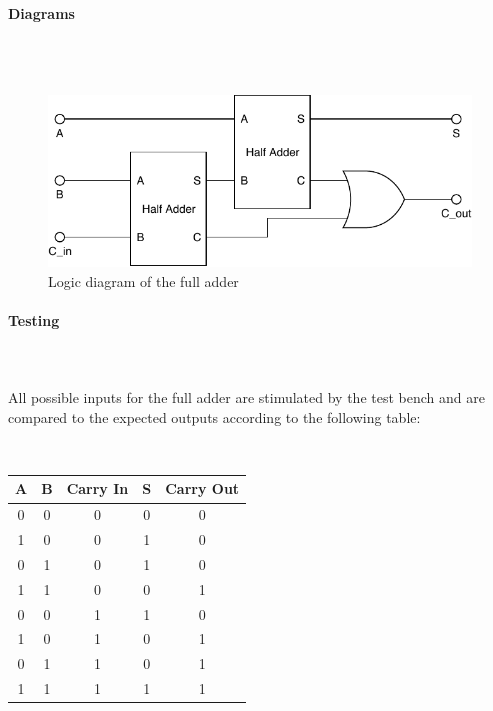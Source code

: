 \documentclass{article}
\begin{document}
    \paragraph{Diagrams}
    \hfill\\\\
    \begin{figure}[H]
        \centering
        \includegraphics{../diagrams/alu/adder/full_adder.pdf}
        \caption{Logic diagram of the full adder}
    \end{figure}

    \paragraph{Testing}
    \hfill\\\\
    All possible inputs for the full adder are stimulated by the test bench
    and are compared to the expected outputs according to the following
    table:

    \hfill\\
    \begin{tabular}{|c|c|c||c|c|}
        \hline
        A & B & Carry In & S & Carry Out
        \\\hline\hline
        0 & 0 & 0 & 0 & 0
        \\\hline
        1 & 0 & 0 & 1 & 0
        \\\hline
        0 & 1 & 0 & 1 & 0
        \\\hline
        1 & 1 & 0 & 0 & 1
        \\\hline
        0 & 0 & 1 & 1 & 0
        \\\hline
        1 & 0 & 1 & 0 & 1
        \\\hline
        0 & 1 & 1 & 0 & 1
        \\\hline
        1 & 1 & 1 & 1 & 1
        \\\hline
    \end{tabular}
\end{document}
